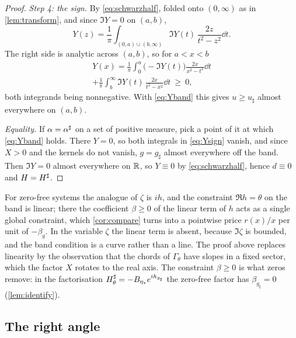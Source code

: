 \begin{proof}
\emph{Step 4: the sign.} By \eqref{eq:schwarzhalf}, folded onto $(0,\infty)$
as in \cref{lem:transform}, and since $\Im Y=0$ on $(a,b)$,
\[
Y(z)=\frac1\pi\int_{(0,a)\cup(b,\infty)}\Im Y(t)\,\frac{2z}{t^2-z^2}\dd t .
\]
The right side is analytic across $(a,b)$, so for $a<x<b$
\begin{multline}\label{eq:Ysign}
Y(x)=\frac1\pi\int_0^a\big(-\Im Y(t)\big)\frac{2x}{x^2-t^2}\dd t\\
+\frac1\pi\int_b^\infty\Im Y(t)\,\frac{2x}{t^2-x^2}\dd t\ \ge\ 0 ,
\end{multline}
both integrands being nonnegative. With \eqref{eq:Yband} this gives
$u\ge u_\sharp$ almost everywhere on $(a,b)$.

\emph{Equality.} If $\alpha={\alpha^{\sharp}}$ on a set of positive measure, pick a point of
it at which \eqref{eq:Yband} holds. There $Y=0$, so both integrals in
\eqref{eq:Ysign} vanish, and since $X>0$ and the kernels do not vanish,
$g=g_\sharp$ almost everywhere off the band. Then $\Im Y=0$ almost
everywhere on $\mathbb R$, so $Y\equiv0$ by \eqref{eq:schwarzhalf}, hence $d\equiv0$
and $H=H^{\sharp}$.
\end{proof}

\begin{remark}\label{rem:whypointwise}
For zero-free systems the analogue of $\zeta$ is $ih$, and the constraint
$\Re h=\theta$ on the band is linear; there the coefficient $\beta\ge0$ of
the linear term of $h$ acts as a single global constraint, which
\cref{cor:compare} turns into a pointwise price $r(x)/x$ per unit of
$-\beta_g$. In the variable
$\zeta$ the linear term is absent, because $\Im\zeta$ is bounded, and the band
condition is a curve rather than a line. The proof above replaces linearity
by the observation that the chords of $\Gamma_\theta$ have slopes in a fixed
sector, which the factor $X$ rotates to the real axis. The constraint
$\beta\ge0$ is what zeros remove: in the factorisation
$H^{\sharp}_\theta=-B_{\eta_\star}e^{ih_{g_\sharp}}$ the zero-free factor has
$\beta_{g_\sharp}=0$ (\cref{lem:identify}).
\end{remark}

\subsection{The right angle}

